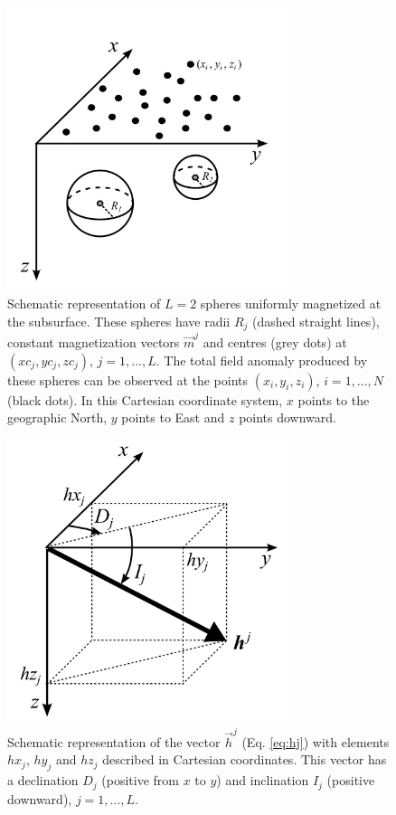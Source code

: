 \documentclass[journal abbreviation, npg]{copernicus}
\begin{document}
\begin{figure}[t]
\vspace*{2mm}
\begin{center}
\includegraphics[width=8.3cm]{Figures/Fig1.png}
\end{center}
\caption{Schematic representation of $L = 2$ spheres uniformly magnetized at the subsurface. These spheres have radii $R_{j}$ (dashed straight lines), constant magnetization vectors $\vec{m}^{j}$ and centres (grey dots) at $(xc_{j}, yc_{j}, zc_{j})$, $j = 1, ..., L$. The total field anomaly produced by these spheres can be observed at the points $(x_{i}, y_{i}, z_{i})$, $i = 1, ..., N$ (black dots). In this Cartesian coordinate system, $x$ points to the geographic North, $y$ points to East and $z$ points downward.}
\label{fig:geometric-aspects}
\end{figure}

\begin{figure}[t]
\vspace*{2mm}
\begin{center}
\includegraphics[width=8.3cm]{Figures/Fig2.png}
\end{center}
\caption{Schematic representation of the vector $\vec{h}^{j}$ (Eq. \ref{eq:hj}) with elements $hx_{j}$, $hy_{j}$ and $hz_{j}$ described in Cartesian coordinates. This vector has a declination $D_{j}$ (positive from $x$ to $y$) and inclination $I_{j}$ (positive downward), $j = 1, ..., L$.}
\label{fig:spherical-coordinates}
\end{figure}
\end{document}
